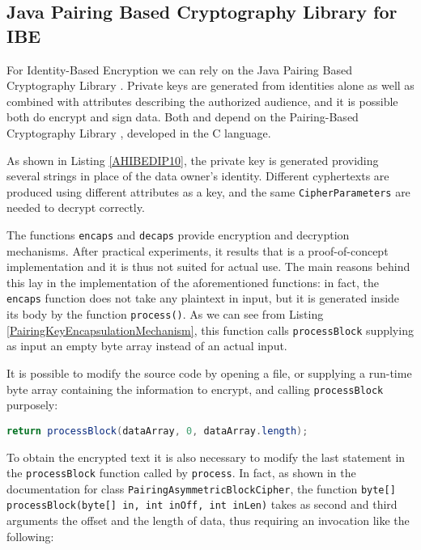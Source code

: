 \subsection{Java Pairing Based Cryptography Library for IBE}
For Identity-Based Encryption we can rely on the Java Pairing Based Cryptography Library \cite{ISCC:DecIov11}. Private keys are generated from identities alone as well as combined with attributes describing the authorized audience, and it is possible both do encrypt and sign data. Both \cite{ISCC:DecIov11} and \cite{bethencourt2011library} depend on the Pairing-Based Cryptography Library \cite{PBC2007Lynn}, developed in the C language.



As shown in Listing \ref{AHIBEDIP10}, the private key is generated providing several strings in place of the data owner's identity. Different cyphertexts are produced using different attributes as a key, and the same \texttt{CipherParameters} are needed to decrypt correctly.

The functions \texttt{encaps} and \texttt{decaps} provide encryption and decryption mechanisms. After practical experiments, it results that \cite{ISCC:DecIov11} is a proof-of-concept implementation and it is thus not suited for actual use. The main reasons behind this lay in the implementation of the aforementioned functions: in fact, the \texttt{encaps} function does not take any plaintext in input, but it is generated inside its body by the function \texttt{process()}. As we can see from Listing \ref{PairingKeyEncapsulationMechanism}, this function calls \texttt{processBlock} supplying as input an empty byte array instead of an actual input.



It is possible to modify the source code by opening a file, or supplying a run-time byte array containing the information to encrypt, and calling \texttt{processBlock} purposely:

\lstinline[language=java]!return processBlock(dataArray, 0, dataArray.length);!

To obtain the encrypted text it is also necessary to modify the last statement in the \texttt{processBlock} function called by \texttt{process}. In fact, as shown in the documentation for class \texttt{PairingAsymmetricBlockCipher}, the function \texttt{byte[] processBlock(byte[] in, int inOff, int inLen)} takes as second and third arguments the offset and the length of data, thus requiring an invocation like the following:

